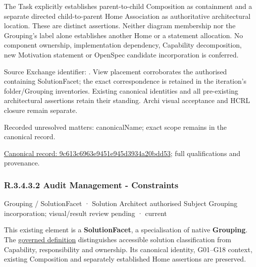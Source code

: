 The Task explicitly establishes parent-to-child Composition as containment and
a separate directed child-to-parent Home Association as authoritative architectural
location. These are distinct assertions. Neither diagram membership nor the
Grouping's label alone establishes another Home or a statement allocation.
No component ownership, implementation dependency, Capability decomposition,
new Motivation statement or OpenSpec candidate incorporation is conferred.



Source Exchange identifier: \texttt{}. View placement corroborates
the authorised containing SolutionFacet; the exact correspondence is retained in the
iteration's folder/Grouping inventories. Existing canonical identities and all
pre-existing architectural assertions retain their standing. Archi visual
acceptance and HCRL closure remain separate.


{\small Recorded unresolved matters: canonicalName; exact scope remains in the canonical record.}\par
{\footnotesize \href{../../../../../../../continuum/grouping/9c613c6963e9451e945d3934a20bdd53.md}{Canonical record: 9c613c6963e9451e945d3934a20bdd53}; full qualifications and provenance.}\par
\subsubsection*{R.3.4.3.2 Audit Management - Constraints}
\label{navigation:R.3.4.3.2}

\label{element:c18ef04adb54413d89bd9434a344504f}
{\small Grouping / SolutionFacet · Solution Architect authorised Subject Grouping incorporation; visual/result review pending · current}\par

This existing element is a \textbf{SolutionFacet}, a specialisation of native
\textbf{Grouping}. The \href{\detokenize{../../../../../../../governance/continuum-representation.md#solutionfacet-classification--1119-candidate}}{governed definition}
distinguishes accessible solution classification from Capability, responsibility
and ownership. Its canonical identity, G01–G18 context, existing Composition
and separately established Home assertions are preserved.



